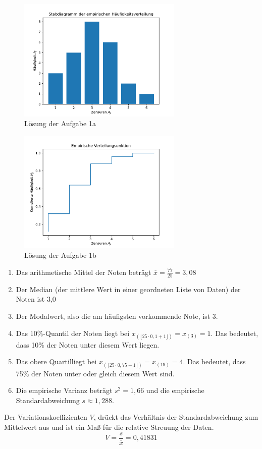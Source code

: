 \documentclass[main.tex]{subfiles}
\begin{document}
\begin{figure}[h]
    \begin{center}
        \includegraphics[width=0.7\textwidth]{A1-a.pdf}
        \caption{Lösung der Aufgabe 1a}
    \end{center}
\end{figure}

\begin{figure}[h!]
    \begin{center}
        \includegraphics[width=0.7\textwidth]{A1-b.pdf}
        \caption{Lösung der Aufgabe 1b}
    \end{center}
\end{figure}
\renewcommand{\labelenumi}{\theenumi}
\renewcommand{\theenumi}{\roman{enumi}.}%
\begin{enumerate}
    \item Das arithmetische Mittel der Noten beträgt $\overline{x}=\frac{77}{25} = 3,08$
    \item Der Median (der mittlere Wert in einer geordneten Liste von Daten) der Noten ist 3,0
    \item Der Modalwert, also die am häufigsten vorkommende Note, ist 3.
    \item Das $10\%$-Quantil der Noten liegt bei $x_{(\lfloor 25 \cdot 0,1 + 1 \rfloor)} = x_{(3)} = 1$. Das bedeutet, dass 10\% der Noten unter diesem Wert liegen.
    \item Das obere Quartilliegt bei $x_{(\lfloor 25 \cdot 0,75 +1 \rfloor)} = x_{(19)} = 4$. Das bedeutet, dass 75\% der Noten unter oder gleich diesem Wert sind.
    \item Die empirische Varianz beträgt $s^2 = 1,66$ und die empirische Standardabweichung $s \approx 1,288$.
\end{enumerate}

Der Variationskoeffizienten $V$, drückt das Verhältnis der Standardabweichung zum Mittelwert aus und ist ein Maß für die relative Streuung der Daten.
$$
    V = \frac{s}{\overline{x}} = 0,41831
$$
\end{document}

